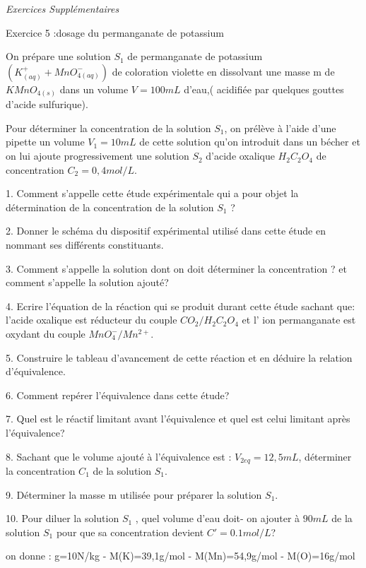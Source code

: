 \documentclass[12pt, french]{article}
\begin{document}
\begin{center}
   \Large{ \em{Exercices Supplémentaires}}
\end{center}


\begin{Box2}{Exercice 5 :dosage du permanganate de potassium }
 
   On prépare une solution $S_1$ de permanganate de potassium $(K^+_{(aq)} + MnO^-_{4 (aq)})$ de coloration violette en dissolvant une
   masse m de $KMnO_{4 (s)}$ dans un volume $V=100mL$ d'eau,( acidifiée par quelques gouttes d'acide sulfurique).

Pour déterminer la concentration de la solution $S_1$, on prélève à l'aide d'une pipette un volume $V_1=10mL$ de cette solution qu'on introduit dans un bécher et on lui ajoute progressivement une solution $S_2$ d'acide oxalique $H_2C_2O_4$ de
concentration $C_2=0,4mol/L$.

1. Comment s'appelle cette étude expérimentale qui a pour objet la détermination de la concentration de la solution $S_1$ ?

2. Donner le schéma du dispositif expérimental utilisé dans cette étude en nommant ses différents constituants.

3. Comment s'appelle la solution dont on doit déterminer la concentration ? et comment s'appelle la solution ajouté?

4. Ecrire l'équation de la réaction qui se produit durant cette étude sachant que:
l'acide oxalique est réducteur du couple $CO_2/H_2C_2O_4$ et l' ion permanganate est oxydant du couple $MnO_4^-/Mn^{2+}$.

5. Construire le tableau d'avancement de cette réaction et en déduire la relation d'équivalence.

6. Comment repérer l'équivalence dans cette étude?

   7. Quel est le réactif limitant avant l'équivalence et quel est celui limitant après l'équivalence?

   8. Sachant que le volume ajouté à l'équivalence est : $V_{2eq}=12,5mL$, déterminer la concentration $C_1$ de la solution $S_1$.

9. Déterminer la masse m utilisée pour préparer la solution $S_1$.

10. Pour diluer la solution $S_1$ , quel volume d'eau doit- on ajouter à $90mL$ de la solution $S_1$ pour que sa concentration devient $ C'=0.1 mol/L $?

on donne : g=10N/kg - M(K)=39,1g/mol - M(Mn)=54,9g/mol - M(O)=16g/mol
\end{Box2}
\end{document}
